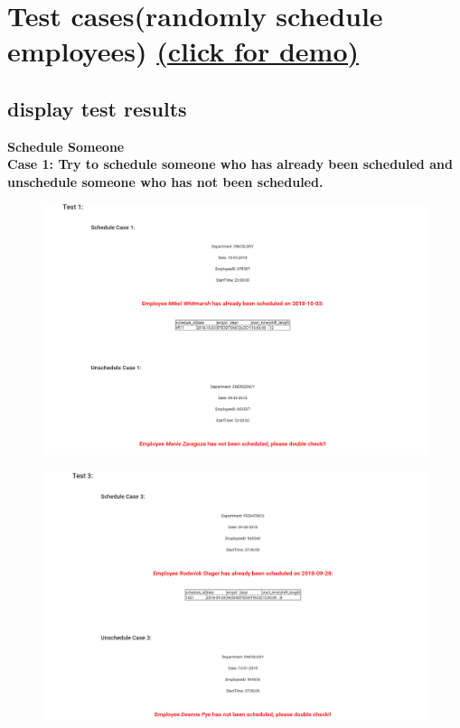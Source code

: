 \documentclass[11pt]{article}
\makeatletter
\def\maxwidth{\ifdim\Gin@nat@width>\linewidth\linewidth
    \else\Gin@nat@width\fi}
\let\Oldincludegraphics\includegraphics
\renewcommand{\includegraphics}[1]{\Oldincludegraphics[width=.8\maxwidth]{#1}}
\makeatother
\begin{document}
    \section*{\texorpdfstring{Test cases(randomly schedule employees)
\href{http://cs431project-jxy225.herokuapp.com/view/test.php}{(click for
demo)}}{Test cases(randomly schedule employees) click for demo}}\label{test-casesrandomly-schedule-employees-click-for-demo}

    \subsection*{display test results}\label{display-test-results}
\mbox{}    

\textbf{Schedule Someone}\\

\noindent    \textbf{Case 1: Try to schedule someone who has already been scheduled and  unschedule someone who has not been scheduled.}

\begin{figure}[H]
        \centering
        \includegraphics{../hw9/4.png}
        \caption{}
    \end{figure}

\begin{figure}[H]
        \centering
        \includegraphics{../hw9/6.png}
        \caption{}
    \end{figure}
\end{document}
